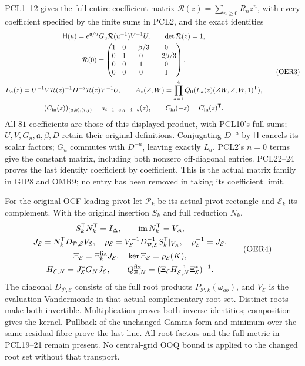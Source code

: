 \documentclass[11pt,a4paper]{article}
\begin{document}
PCL1--12 gives the full entire coefficient matrix
$\mathcal R(z)=\sum_{n\ge0}R_nz^n$, with every coefficient
specified by the finite sums in PCL2, and the exact identities
\[
\begin{gathered}
 \mathsf H(u)=e^{\mathfrak a/u}G_u\mathcal R(u^{-1})V^{-1}U,
 \qquad \det\mathcal R(z)=1,\\
 \mathcal R(0)=
 \begin{pmatrix}1&0&-\beta/3&0\\0&1&0&-2\beta/3\\
                 0&0&1&0\\0&0&0&1\end{pmatrix},\\
 L_a(z)=U^{-1}V\mathcal R(z)^{-1}D^{-a}
                         \mathcal R(z)V^{-1}U,\qquad
 A_z(Z,W)=\prod_{a=1}^4Q_0(L_a(z)(ZW,Z,W,1)^{\mathsf T}),\\
 (C_{\rm in}(z))_{(a,b),(i,j)}=a_{i+4-a,j+4-b}(z),
 \qquad C_{\rm in}(-z)=C_{\rm in}(z)^{\mathsf T}.
\end{gathered}\tag{OER3}
\]
All $81$ coefficients are those of this displayed product, with
PCL10's full sums; $U,V,G_u,\mathfrak a,\beta,D$ retain their
original definitions. Conjugating $D^{-a}$ by $\mathsf H$
cancels its scalar factors; $G_u$ commutes with $D^{-a}$,
leaving exactly $L_a$. PCL2's $n=0$ terms give the constant
matrix, including both nonzero off-diagonal entries.
PCL22--24 proves the last identity coefficient by coefficient.
This is the actual matrix family in GIP8 and OMR9; no entry
has been removed in taking its coefficient limit.

For the original OCF leading pivot let $\mathcal P_k$ be its
actual pivot rectangle and $\mathcal E_k$ its complement.
With the original insertion $S_k$ and full reduction $N_k$,
\[
\begin{gathered}
 S_k^{\mathsf T}N_k^{\mathsf T}=I_\Delta,\qquad
 \operatorname{im}N_k^{\mathsf T}=V_A,\\
 J_{\mathcal E}=N_k^{\mathsf T}
                D_{\mathcal P,\mathcal E}V_{\mathcal E},
 \quad \rho_{\mathcal E}=V_{\mathcal E}^{-1}
       D_{\mathcal P,\mathcal E}^{-1}S_k^{\mathsf T}|_{V_A},
 \quad \rho_{\mathcal E}^{-1}=J_{\mathcal E},\\
 \Xi_{\mathcal E}=\Xi_k^{\rm fix}J_{\mathcal E},\quad
 \ker\Xi_{\mathcal E}=\rho_{\mathcal E}(K),\\
 H_{\mathcal E,N}=J_{\mathcal E}^*G_NJ_{\mathcal E},\qquad
 Q_{\Xi,N}^{\rm fix}
   =(\Xi_{\mathcal E}H_{\mathcal E,N}^{-1}\Xi_{\mathcal E}^*)^{-1}.
\end{gathered}\tag{OER4}
\]
The diagonal $D_{\mathcal P,\mathcal E}$ consists of the full
root products $P_{\mathcal P,k}(\omega_{ab})$, and
$V_{\mathcal E}$ is the evaluation Vandermonde in that actual
complementary root set. Distinct roots make both invertible.
Multiplication proves both inverse identities; composition gives
the kernel. Pullback of the unchanged Gamma form and minimum
over the same residual fibre prove the last line. All root factors
and the full metric in PCL19--21 remain present. No central-grid
OOQ bound is applied to the changed root set without that transport.
\end{document}
